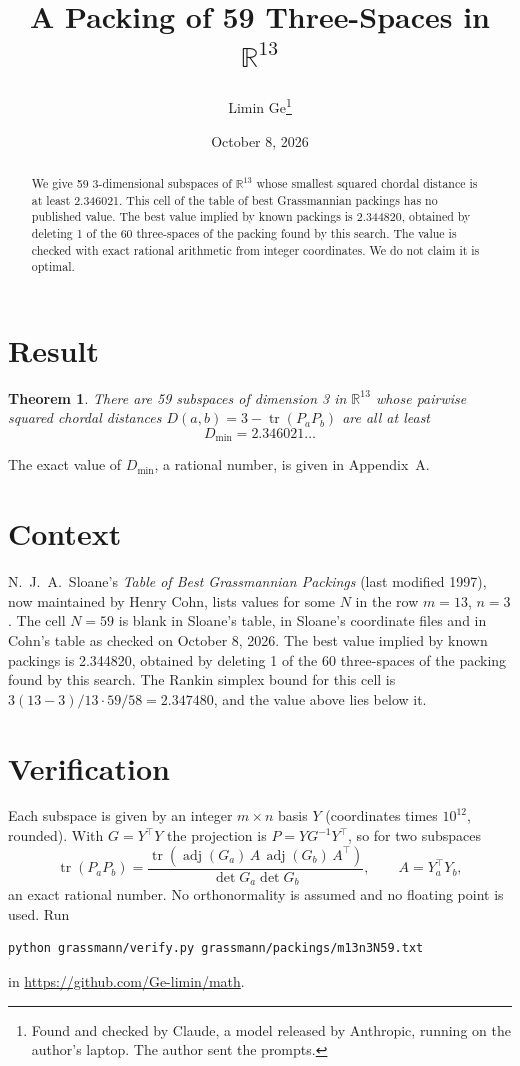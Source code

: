 \documentclass[11pt,a4paper]{article}
\title{A Packing of 59 Three-Spaces in $\mathbb{R}^{13}$}
\author{Limin Ge\thanks{Found and checked by Claude, a model released by Anthropic, running on the author's laptop. The author sent the prompts.}}
\date{October 8, 2026}
\newtheorem*{theorem}{Theorem}
\begin{document}
\maketitle
\begin{abstract}
We give 59 3-dimensional subspaces of $\mathbb{R}^{13}$ whose smallest squared chordal distance is at least 2.346021. This cell of the table of best Grassmannian packings has no published value. The best value implied by known packings is 2.344820, obtained by deleting 1 of the 60 three-spaces of the packing found by this search. The value is checked with exact rational arithmetic from integer coordinates. We do not claim it is optimal.
\end{abstract}

\section{Result}
\begin{theorem}
There are 59 subspaces of dimension 3 in $\mathbb{R}^{13}$ whose pairwise squared chordal distances $D(a,b) = 3 - \operatorname{tr}(P_aP_b)$ are all at least
\[ D_{\min} = 2.346021\ldots \]
\end{theorem}
The exact value of $D_{\min}$, a rational number, is given in Appendix~A.


\section{Context}
N.~J.~A.~Sloane's \emph{Table of Best Grassmannian Packings} (last modified 1997), now maintained by Henry Cohn, lists values for some $N$ in the row $m=13$, $n=3$. The cell $N=59$ is blank in Sloane's table, in Sloane's coordinate files and in Cohn's table as checked on October 8, 2026. The best value implied by known packings is 2.344820, obtained by deleting 1 of the 60 three-spaces of the packing found by this search. The Rankin simplex bound for this cell is $3(13-3)/13\cdot 59/58 = 2.347480$, and the value above lies below it.


\section{Verification}
Each subspace is given by an integer $m\times n$ basis $Y$ (coordinates times $10^{12}$, rounded). With $G=Y^\top Y$ the projection is $P=YG^{-1}Y^\top$, so for two subspaces
\[ \operatorname{tr}(P_aP_b)=\frac{\operatorname{tr}(\operatorname{adj}(G_a)\,A\,\operatorname{adj}(G_b)\,A^\top)}{\det G_a\det G_b},\qquad A=Y_a^\top Y_b, \]
an exact rational number. No orthonormality is assumed and no floating point is used. Run
\begin{verbatim}
python grassmann/verify.py grassmann/packings/m13n3N59.txt
\end{verbatim}
in \url{https://github.com/Ge-limin/math}.
\end{document}
